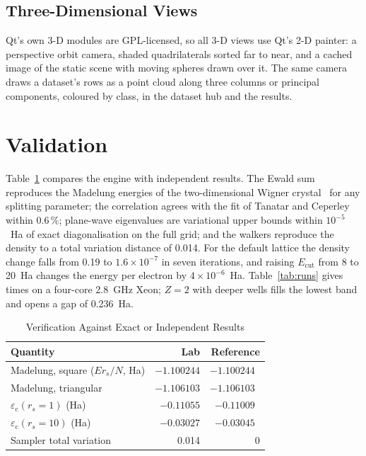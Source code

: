 \documentclass[conference]{IEEEtran}
\begin{document}
\subsection{Three-Dimensional Views}
Qt's own 3-D modules are GPL-licensed, so all 3-D views use Qt's 2-D painter: a perspective
orbit camera, shaded quadrilaterals sorted far to near, and a cached image of the static scene
with moving spheres drawn over it. The same camera draws a dataset's rows as a point cloud along
three columns or principal components, coloured by class, in the dataset hub and the results.

\section{Validation}
Table~\ref{tab:verify} compares the engine with independent results. The Ewald sum reproduces
the Madelung energies of the two-dimensional Wigner crystal~\cite{bonsall1977wigner} for any
splitting parameter; the correlation agrees with the fit of Tanatar and
Ceperley~\cite{tanatar1989ground} within 0.6\,\%; plane-wave eigenvalues are variational upper
bounds within $10^{-5}$~Ha of exact diagonalisation on the full grid; and the walkers reproduce the
density to a total variation distance of 0.014. For the default lattice the density change falls
from 0.19 to $1.6\times10^{-7}$ in seven iterations, and raising $E_{\mathrm{cut}}$ from 8 to 20~Ha
changes the energy per electron by $4\times10^{-6}$~Ha. Table~\ref{tab:runs} gives times on a
four-core 2.8~GHz Xeon; $Z=2$ with deeper wells fills the lowest band and opens a gap of 0.236~Ha.

\begin{table}[t]
\caption{Verification Against Exact or Independent Results}
\label{tab:verify}
\centering
\begin{tabular}{@{}lrr@{}}
\toprule
Quantity & Lab & Reference \\
\midrule
Madelung, square ($E r_s/N$, Ha) & $-1.100244$ & $-1.100244$~\cite{bonsall1977wigner} \\
Madelung, triangular & $-1.106103$ & $-1.106103$~\cite{bonsall1977wigner} \\
$\varepsilon_{\mathrm c}(r_s{=}1)$ (Ha) & $-0.11055$ & $-0.11009$~\cite{tanatar1989ground} \\
$\varepsilon_{\mathrm c}(r_s{=}10)$ (Ha) & $-0.03027$ & $-0.03045$~\cite{tanatar1989ground} \\
Sampler total variation & 0.014 & 0 \\
\bottomrule
\end{tabular}
\end{table}
\end{document}
